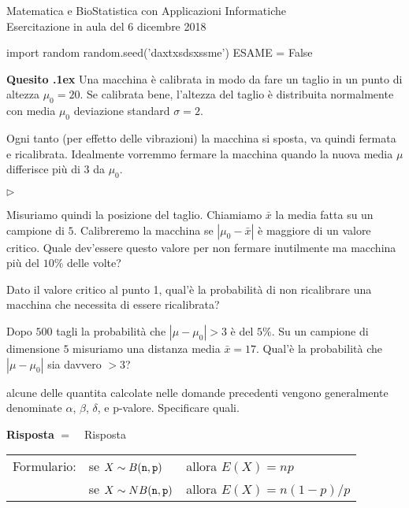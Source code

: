 \documentclass[11pt,twoside,a4paper]{article}
\newcommand{\mylabel}[1]{#1\hfill}
\renewenvironment{itemize}
  {\begin{list}{$\triangleright$}{%
   \setlength{\parskip}{0mm}
   \setlength{\topsep}{.4\baselineskip}
   \setlength{\rightmargin}{0mm}
   \setlength{\listparindent}{0mm}
   \setlength{\itemindent}{0mm}
   \setlength{\labelwidth}{2ex}
   \setlength{\itemsep}{.4\baselineskip}
   \setlength{\parsep}{0mm}
   \setlength{\partopsep}{0mm}
   \setlength{\labelsep}{1ex}
   \setlength{\leftmargin}{\labelwidth+\labelsep}
   \let\makelabel\mylabel}}{%
   \end{list}\vspace*{-1.3mm}}
\newcounter{quesito}
\newenvironment{question}{\addtocounter{quesito}{1}\par\textbf{Quesito \thequesito.\kern1ex}}{\vspace{0.5\parskip}}
\newenvironment{answer}{\par\textbf{Risposta\quad}}{\vspace{\parskip}}
\begin{document}
\colorbox{blue!10}{\begin{minipage}{\textwidth}
Matematica e BioStatistica con Applicazioni Informatiche\\
Esercitazione in aula del 6 dicembre 2018
\end{minipage}}



\begin{pycode}
import random
random.seed('daxtxsdsxssme')
ESAME = False
\end{pycode}


\bigskip\bigskip
\begin{question}
Una macchina è calibrata in modo da fare un taglio in un punto di altezza $\mu_0=20$. Se calibrata bene, l'altezza del taglio è distribuita normalmente con media $\mu_0$ deviazione standard $\sigma=2$. 

Ogni tanto (per effetto delle vibrazioni) la macchina si sposta, va quindi fermata e ricalibrata. Idealmente vorremmo fermare la macchina quando la nuova media $\mu$ differisce più di $3$ da $\mu_0$.

\begin{itemize}
\item[1.] Misuriamo quindi la posizione del taglio. Chiamiamo $\bar x$ la media fatta su un campione di $5$. Calibreremo la macchina se $|\mu_0-\bar x|$ è maggiore di un valore critico. Quale dev'essere questo valore per non fermare inutilmente ma macchina più del $10\%$ delle volte?

\item[2.] Dato il valore critico al punto 1, qual'è la probabilità di non ricalibrare una macchina che necessita di essere ricalibrata?

\item[3.] Dopo $500$ tagli la probabilità che $|\mu-\mu_0|>3$ è del $5\%$.  Su un campione di dimensione $5$ misuriamo una distanza media $\bar x=17$. Qual'è la probabilità che  $|\mu-\mu_0|$ sia davvero $>3$?

\item[4] alcune delle quantita calcolate nelle domande precedenti vengono generalmente denominate $\alpha$, $\beta$, $\delta$, e p-valore. Specificare quali.
\end{itemize}
\begin{answer}
$ =\ ${\tt {\color{blue}   }}\hfill{\color{blue} Risposta} 
\end{answer}
\end{question}


\vfill\hrulefill\par
\begin{tabular}{@{}lll}
Formulario:& se $X\sim B({\tt n},{\tt p})$ & allora $E(X)=np$\\
           & se $X\sim NB({\tt n},{\tt p})$& allora $E(X)=n(1-p)/p$
\end{tabular}
\end{document}
